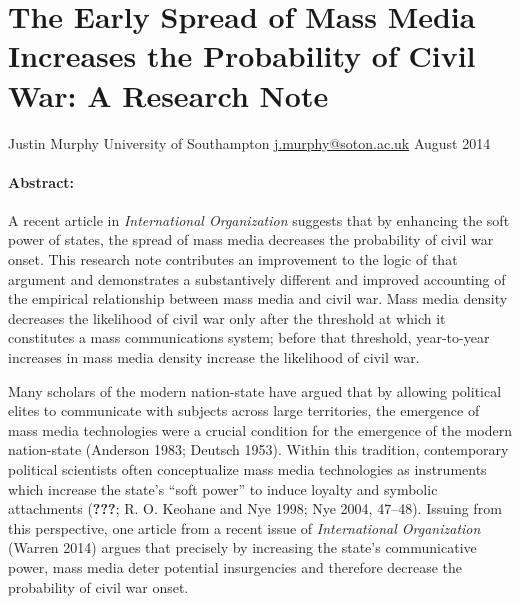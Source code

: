 \documentclass[11pt,article,oneside]{memoir}
\author{}
\date{}
\begin{document}
  
\setsansfont[Mapping=tex-text]{Gill Sans} 
\setmonofont[Mapping=tex-text,Scale=0.8]{Consolas}
\pagestyle{kjh}

\singlespacing





\thispagestyle{empty}

\section{The Early Spread of Mass Media Increases the Probability of
Civil War: A Research
Note}\label{the-early-spread-of-mass-media-increases-the-probability-of-civil-war-a-research-note}

Justin Murphy \newline
University of Southampton \newline     
\href{mailto:j.murphy@soton.ac.uk}{j.murphy@soton.ac.uk} \newline    
August 2014 \newline        

\paragraph{Abstract:}\label{abstract}

A recent article in \emph{International Organization} suggests that by
enhancing the soft power of states, the spread of mass media decreases
the probability of civil war onset. This research note contributes an
improvement to the logic of that argument and demonstrates a
substantively different and improved accounting of the empirical
relationship between mass media and civil war. Mass media density
decreases the likelihood of civil war only after the threshold at which
it constitutes a mass communications system; before that threshold,
year-to-year increases in mass media density increase the likelihood of
civil war.

\clearpage
{}

\onehalfspacing

Many scholars of the modern nation-state have argued that by allowing
political elites to communicate with subjects across large territories,
the emergence of mass media technologies were a crucial condition for
the emergence of the modern nation-state (Anderson 1983; Deutsch 1953).
Within this tradition, contemporary political scientists often
conceptualize mass media technologies as instruments which increase the
state's ``soft power'' to induce loyalty and symbolic attachments
({\textbf{???}}; R. O. Keohane and Nye 1998; Nye 2004, 47--48). Issuing
from this perspective, one article from a recent issue of
\emph{International Organization} (Warren 2014) argues that precisely by
increasing the state's communicative power, mass media deter potential
insurgencies and therefore decrease the probability of civil war onset.
\end{document}

